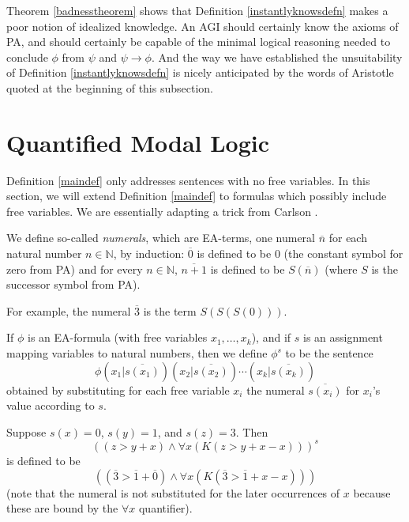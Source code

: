 \documentclass[runningheads]{llncs}
\begin{document}
Theorem \ref{badnesstheorem} shows that Definition \ref{instantlyknowsdefn}
makes a poor notion of idealized knowledge. An AGI should certainly
know the axioms of PA, and should certainly be capable of the
minimal logical reasoning needed to conclude $\phi$ from $\psi$ and $\psi\rightarrow\phi$.
And the way we have established the unsuitability of Definition \ref{instantlyknowsdefn}
is nicely anticipated by the words of Aristotle quoted at the beginning of this subsection.



\section{Quantified Modal Logic}
\label{quantifiedsection}

Definition \ref{maindef} only addresses sentences with no free variables.
In this section, we will extend Definition \ref{maindef} to formulas which possibly include
free variables. We are essentially adapting a trick from
Carlson \cite{carlson}.

\begin{definition}
  We define so-called \emph{numerals}, which
  are EA-terms, one numeral $\overline n$ for each natural number $n\in\mathbb N$,
  by induction: $\overline 0$ is defined to be $0$ (the constant symbol for zero from
  PA) and
  for every $n\in\mathbb N$, $\overline{n+1}$ is defined to be $S(\overline n)$
  (where $S$ is the successor symbol from PA).
\end{definition}

For example, the numeral $\overline 3$ is the term $S(S(S(0)))$.

\begin{definition}
\label{superscript_s_defn}
  If $\phi$ is an EA-formula (with free variables
  $x_1,\ldots,x_k$),
  and if $s$ is an assignment mapping variables to natural numbers, then we define $\phi^s$
  to be the sentence
  \[
    \phi(x_1|\overline{s(x_1)})(x_2|\overline{s(x_2)})\cdots (x_k|\overline{s(x_k)})
  \]
  obtained by substituting for each free variable $x_i$ the numeral $\overline{s(x_i)}$
  for $x_i$'s value according to $s$.
\end{definition}

\begin{example}
  Suppose $s(x)=0$, $s(y)=1$, and $s(z)=3$. Then
  \[
  ((z>y+x) \wedge \forall x(K(z>y+x-x)))^s
  \]
  is defined to be
  \[
  ((\overline 3 > \overline 1+\overline 0)
  \wedge \forall x( K( \overline 3 > \overline 1 + x - x ) ))
  \]
  (note that the numeral is not substituted for the later occurrences of $x$ because
  these are bound by the $\forall x$ quantifier).
\end{example}
\end{document}
